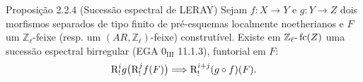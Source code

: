 \begin{statement}{Proposição 2.2.4 (Sucessão espectral de LERAY)}
Sejam \(f:X\to Y\) e \(g:Y\to Z\) dois morfismos separados de tipo finito de pré-esquemas localmente noetherianos e \(F\) um \(\mathbb Z_\ell\)-feixe (resp. um \((AR,\mathbb Z_\ell)\)-feixe) construtível. Existe em \(\mathbb Z_\ell\text{-}\operatorname{fc}(Z)\) uma sucessão espectral birregular (EGA \(0_{\mathrm{III}}\) 11.1.3), funtorial em \(F\):
\[
\mathrm{R}^i_!g\bigl(\mathrm{R}^j_!f(F)\bigr)\Longrightarrow \mathrm{R}^{i+j}_!(g\circ f)(F).
\]
\end{statement}
